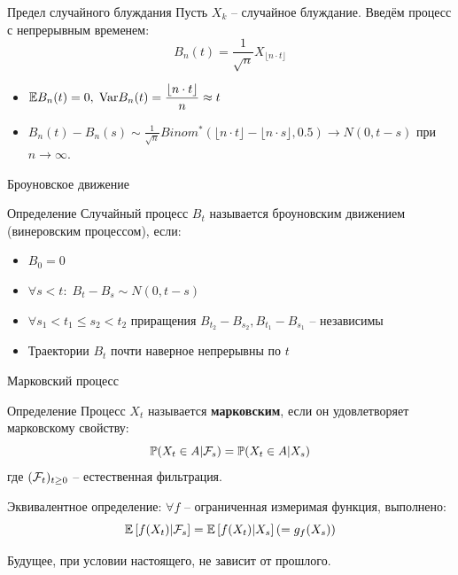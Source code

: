 \documentclass[aspectratio=169]{beamer}
\begin{document}
\begin{frame}{Предел случайного блуждания}
    Пусть $X_k$ -- случайное блуждание. Введём процесс с непрерывным временем:
    $$
        B_{n}(t) = \frac{1}{\sqrt{n}} X_{\lfloor n \cdot t \rfloor}
    $$
    \begin{itemize}
        \item $\mathbb{E} B_n(t) = 0, \; \mathrm{Var} B_n(t) = \dfrac{\lfloor n \cdot t \rfloor}{n} \approx t$
        \item $B_n(t) - B_n(s) \sim \frac{1}{\sqrt{n}} Binom^*(\lfloor n \cdot t \rfloor - \lfloor n \cdot s \rfloor, 0.5) \to N(0, t-s)$ при $n\to\infty$.
    \end{itemize}
\end{frame}

\begin{frame}{Броуновское движение}
    \begin{block}{Определение}
        Случайный процесс $B_t$ называется броуновским движением (винеровским процессом), если:
        \begin{itemize}
            \item $B_0 = 0$
            \item $\forall s < t: \; B_t - B_s \sim N(0, t - s)$
            \item $\forall s_1 < t_1 \leq s_2 < t_2$ приращения
            $B_{t_2} - B_{s_2}, B_{t_1} - B_{s_1}$ -- независимы
            \item Траектории $B_t$ почти наверное непрерывны по $t$ 
        \end{itemize}
    \end{block}
\end{frame}

\begin{frame}{Марковский процесс}
    \begin{block}{Определение}
        Процесс $X_t$ называется \textbf{марковским}, если он удовлетворяет марковскому свойству:
        $$
            \mathbb{P}(X_t \in A | \mathcal{F}_s) = \mathbb{P} (X_t \in A | X_s)
        $$где $(\mathcal{F}_t)_{t\geq0}$ -- естественная фильтрация.
    \end{block}
    Эквивалентное определение: $\forall f$ -- ограниченная измеримая функция, выполнено:
    $$
        \mathbb{E} \left[ f(X_t) | \mathcal{F}_s \right] = \mathbb{E} \left[ f(X_t) | X_s \right] \left(= g_f(X_s)\right)
    $$

    Будущее, при условии настоящего, не зависит от прошлого.
\end{frame}
\end{document}

